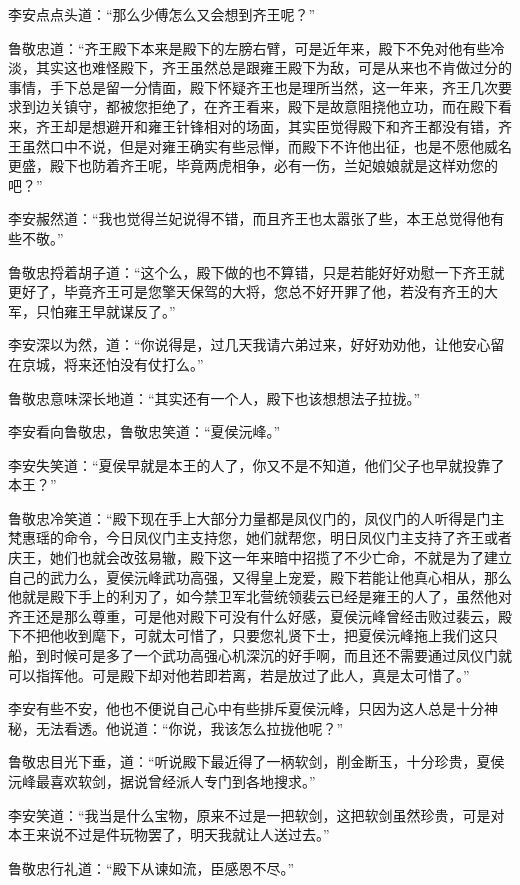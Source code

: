 李安点点头道：“那么少傅怎么又会想到齐王呢？”

鲁敬忠道：“齐王殿下本来是殿下的左膀右臂，可是近年来，殿下不免对他有些冷淡，其实这也难怪殿下，齐王虽然总是跟雍王殿下为敌，可是从来也不肯做过分的事情，手下总是留一分情面，殿下怀疑齐王也是理所当然，这一年来，齐王几次要求到边关镇守，都被您拒绝了，在齐王看来，殿下是故意阻挠他立功，而在殿下看来，齐王却是想避开和雍王针锋相对的场面，其实臣觉得殿下和齐王都没有错，齐王虽然口中不说，但是对雍王确实有些忌惮，而殿下不许他出征，也是不愿他威名更盛，殿下也防着齐王呢，毕竟两虎相争，必有一伤，兰妃娘娘就是这样劝您的吧？”

李安赧然道：“我也觉得兰妃说得不错，而且齐王也太嚣张了些，本王总觉得他有些不敬。”

鲁敬忠捋着胡子道：“这个么，殿下做的也不算错，只是若能好好劝慰一下齐王就更好了，毕竟齐王可是您擎天保驾的大将，您总不好开罪了他，若没有齐王的大军，只怕雍王早就谋反了。”

李安深以为然，道：“你说得是，过几天我请六弟过来，好好劝劝他，让他安心留在京城，将来还怕没有仗打么。”

鲁敬忠意味深长地道：“其实还有一个人，殿下也该想想法子拉拢。”

李安看向鲁敬忠，鲁敬忠笑道：“夏侯沅峰。”

李安失笑道：“夏侯早就是本王的人了，你又不是不知道，他们父子也早就投靠了本王？”

鲁敬忠冷笑道：“殿下现在手上大部分力量都是凤仪门的，凤仪门的人听得是门主梵惠瑶的命令，今日凤仪门主支持您，她们就帮您，明日凤仪门主支持了齐王或者庆王，她们也就会改弦易辙，殿下这一年来暗中招揽了不少亡命，不就是为了建立自己的武力么，夏侯沅峰武功高强，又得皇上宠爱，殿下若能让他真心相从，那么他就是殿下手上的利刃了，如今禁卫军北营统领裴云已经是雍王的人了，虽然他对齐王还是那么尊重，可是他对殿下可没有什么好感，夏侯沅峰曾经击败过裴云，殿下不把他收到麾下，可就太可惜了，只要您礼贤下士，把夏侯沅峰拖上我们这只船，到时候可是多了一个武功高强心机深沉的好手啊，而且还不需要通过凤仪门就可以指挥他。可是殿下却对他若即若离，若是放过了此人，真是太可惜了。”

李安有些不安，他也不便说自己心中有些排斥夏侯沅峰，只因为这人总是十分神秘，无法看透。他说道：“你说，我该怎么拉拢他呢？”

鲁敬忠目光下垂，道：“听说殿下最近得了一柄软剑，削金断玉，十分珍贵，夏侯沅峰最喜欢软剑，据说曾经派人专门到各地搜求。”

李安笑道：“我当是什么宝物，原来不过是一把软剑，这把软剑虽然珍贵，可是对本王来说不过是件玩物罢了，明天我就让人送过去。”

鲁敬忠行礼道：“殿下从谏如流，臣感恩不尽。”

